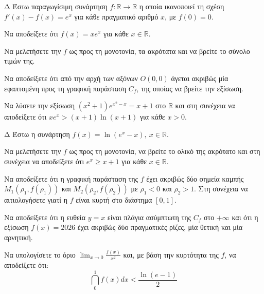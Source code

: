 \begin{thema}{Δ}
Έστω παραγωγίσιμη συνάρτηση $f:\mathbb{R} \to \mathbb{R}$ η οποία ικανοποιεί τη σχέση $f'(x) - f(x) = e^x$ για κάθε πραγματικό αριθμό $x$, με $f(0)=0$.
\begin{erwthma}
    \item Να αποδείξετε ότι $f(x) = x e^x$ για κάθε $x \in \mathbb{R}$.
    \item Να μελετήσετε την $f$ ως προς τη μονοτονία, τα ακρότατα και να βρείτε το σύνολο τιμών της.
    \item Να αποδείξετε ότι από την αρχή των αξόνων $O(0,0)$ άγεται ακριβώς μία εφαπτομένη προς τη γραφική παράσταση $C_f$, της οποίας να βρείτε την εξίσωση.
    \item Να λύσετε την εξίσωση $\displaystyle (x^2+1) e^{x^2-x} = x+1$ στο $\mathbb{R}$ και στη συνέχεια να αποδείξετε ότι $x e^x > (x+1)\ln(x+1)$ για κάθε $x>0$.
\end{erwthma}
\end{thema}

\begin{thema}{Δ}
Έστω η συνάρτηση $\displaystyle f(x) = \ln(e^x - x), \ x \in \mathbb{R}$.
\begin{erwthma}
    \item Να μελετήσετε την $f$ ως προς τη μονοτονία, να βρείτε το ολικό της ακρότατο και στη συνέχεια να αποδείξετε ότι $e^x \ge x+1$ για κάθε $x \in \mathbb{R}$.
    \item Να αποδείξετε ότι η γραφική παράσταση της $f$ έχει ακριβώς δύο σημεία καμπής $M_1(\rho_1, f(\rho_1))$ και $M_2(\rho_2, f(\rho_2))$ με $\rho_1 < 0$ και $\rho_2 > 1$. Στη συνέχεια να αιτιολογήσετε γιατί η $f$ είναι κυρτή στο διάστημα $[0, 1]$.
    \item Να αποδείξετε ότι η ευθεία $y = x$ είναι πλάγια ασύμπτωτη της $C_f$ στο $+\infty$ και ότι η εξίσωση $f(x) = 2026$ έχει ακριβώς δύο πραγματικές ρίζες, μία θετική και μία αρνητική.
    \item Να υπολογίσετε το όριο $\displaystyle \lim_{x\to 0} \frac{f(x)}{x^2}$ και, με βάση την κυρτότητα της $f$, να αποδείξετε ότι:
    \[ \dint_0^1 f(x) dx < \frac{\ln(e-1)}{2} \]
\end{erwthma}
\end{thema}

